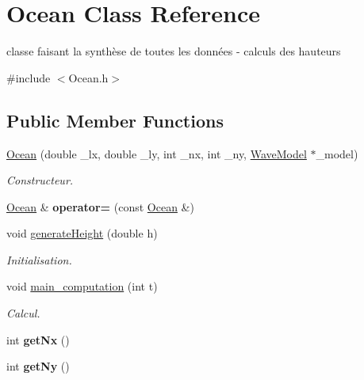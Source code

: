 \hypertarget{class_ocean}{}\section{Ocean Class Reference}
\label{class_ocean}


classe faisant la synthèse de toutes les données -\/ calculs des hauteurs  




{\ttfamily \#include $<$Ocean.\+h$>$}

\subsection*{Public Member Functions}
\begin{DoxyCompactItemize}
\item 
\hyperlink{class_ocean_a6a56fee065163c5bd6e5286879648407}{Ocean} (double \+\_\+lx, double \+\_\+ly, int \+\_\+nx, int \+\_\+ny, \hyperlink{class_wave_model}{Wave\+Model} $\ast$\+\_\+model)
\begin{DoxyCompactList}\small\item\em Constructeur. \end{DoxyCompactList}\item 
\hypertarget{class_ocean_af8e1a8ac9f96ae135974e0ed95c61ff8}{}\label{class_ocean_af8e1a8ac9f96ae135974e0ed95c61ff8} 
\hyperlink{class_ocean}{Ocean} \& {\bfseries operator=} (const \hyperlink{class_ocean}{Ocean} \&)
\item 
void \hyperlink{class_ocean_a3f3c62c66d2e25ee9c1fb571f66809e4}{generate\+Height} (double h)
\begin{DoxyCompactList}\small\item\em Initialisation. \end{DoxyCompactList}\item 
void \hyperlink{class_ocean_ae2b45ea776fbb72552af532b2cd8b120}{main\+\_\+computation} (int t)
\begin{DoxyCompactList}\small\item\em Calcul. \end{DoxyCompactList}\item 
\hypertarget{class_ocean_abd4079afe50333f62d206cf1f4ad94b2}{}\label{class_ocean_abd4079afe50333f62d206cf1f4ad94b2} 
int {\bfseries get\+Nx} ()
\item 
\hypertarget{class_ocean_a5d5ec3b226e48b36ea4f0935bab59d90}{}\label{class_ocean_a5d5ec3b226e48b36ea4f0935bab59d90} 
int {\bfseries get\+Ny} ()
\item 
\hypertarget{class_ocean_a7a70306563f904db9d1e45341b0ee17b}{}\label{class_ocean_a7a70306563f904db9d1e45341b0ee17b} 

\end{DoxyCompactItemize}
